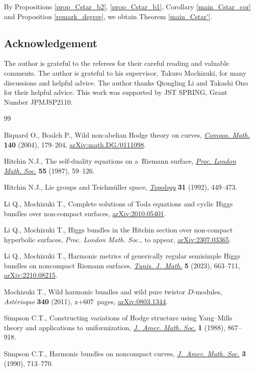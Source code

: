 \documentclass[10pt,a4paper]{amsart}
\numberwithin{equation}{section}
\begin{document}
By Propositions \ref{prop_Cstar_b2}, \ref{prop_Cstar_b1}, Corollary \ref{main_Cstar_cor} and Proposition \ref{remark_degree}, we obtain Theorem \ref{main_Cstar'}.

\subsection*{Acknowledgement}
The author is grateful to the referees for their careful reading and valuable comments.
The author is grateful to his supervisor, Takuro Mochizuki, for many discussions and helpful advice.
The author thanks Qiongling Li and Takashi Ono for their helpful advice.
This work was supported by JST SPRING, Grant Number JPMJSP2110.

\begin{thebibliography}{99}
\footnotesize\itemsep=0pt

Biquard O., Boalch P., Wild non-abelian {H}odge theory on curves,
 \href{https://doi.org/10.1112/S0010437X03000010}{\textit{Compos. Math.}} \textbf{140} (2004), 179--204,
 \href{https://arxiv.org/abs/math.DG/0111098}{arXiv:math.DG/0111098}.

Hitchin N.J., The self-duality equations on a~{R}iemann surface, \href{https://doi.org/10.1112/plms/s3-55.1.59}{\textit{Proc.
 London Math. Soc.}} \textbf{55} (1987), 59--126.

Hitchin N.J., Lie groups and {T}eichm\"uller space, \href{https://doi.org/10.1016/0040-9383(92)90044-I}{\textit{Topology}}
 \textbf{31} (1992), 449--473.

Li Q., Mochizuki T., Complete solutions of {T}oda equations and cyclic {H}iggs
 bundles over non-compact surfaces, \href{https://arxiv.org/abs/2010.05401}{arXiv:2010.05401}.

Li Q., Mochizuki T., Higgs bundles in the {H}itchin section over non-compact
 hyperbolic surfaces, \textit{Proc. London Math. Soc.}, {t}o appear,
 \href{https://arxiv.org/abs/2307.03365}{arXiv:2307.03365}.

Li Q., Mochizuki T., Harmonic metrics of generically regular semisimple {H}iggs
 bundles on noncompact {R}iemann surfaces, \href{https://doi.org/10.2140/tunis.2023.5.663}{\textit{Tunis. J.~Math.}} \textbf{5}
 (2023), 663--711, \href{https://arxiv.org/abs/2210.08215}{arXiv:2210.08215}.

Mochizuki T., Wild harmonic bundles and wild pure twistor {$D$}-modules,
 \textit{Ast\'erisque} \textbf{340} (2011), x+607~pages, \href{https://arxiv.org/abs/0803.1344}{arXiv:0803.1344}.

Simpson C.T., Constructing variations of {H}odge structure using
 {Y}ang--{M}ills theory and applications to uniformization, \href{https://doi.org/10.2307/1990994}{\textit{J.~Amer.
 Math. Soc.}} \textbf{1} (1988), 867--918.

Simpson C.T., Harmonic bundles on noncompact curves, \href{https://doi.org/10.2307/1990935}{\textit{J.~Amer. Math.
 Soc.}} \textbf{3} (1990), 713--770.

\end{thebibliography}
\end{document}
